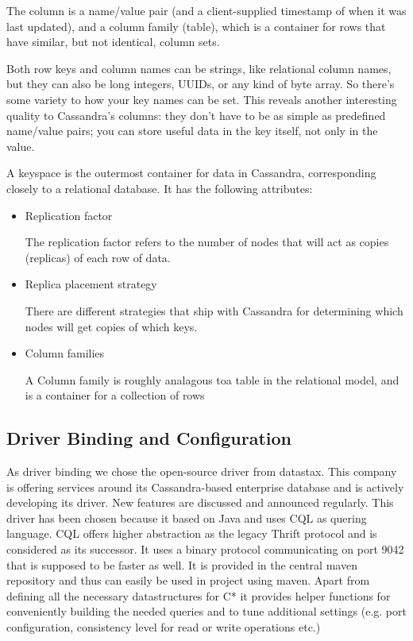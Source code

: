 The column is a name/value pair (and a client-supplied timestamp of when it was last updated), and a column family (table), which is a container for rows that have similar, but not
identical, column sets.

Both row keys and column names can be strings, like relational column names, but they can also be long integers, UUIDs, or any kind of byte array. So there’s some variety to how your key names can be set. This reveals another interesting quality to Cassandra’s columns: they don’t have to be as simple as predefined name/value pairs; you can store useful data in the key itself, not only in the value. 

A keyspace is the outermost container for data in Cassandra, corresponding closely to a relational database. It has the following attributes:
\begin{itemize}
  \item Replication factor
  
  The replication factor refers to the number of nodes that will act as copies (replicas) of each row of data.
  \item Replica placement strategy
  
  There are different strategies that ship with Cassandra for determining which nodes will get copies of which keys.
  \item Column families
  
  A Column family is roughly analagous toa table in the relational model, and is a container for a collection of rows
\end{itemize}

\subsection{Driver Binding and Configuration}
\label{sect:binding}
As driver binding we chose the open-source driver from datastax. This company is offering services around its Cassandra-based enterprise database and is actively developing its driver. New features are discussed and announced regularly. This driver has been chosen because it based on Java and uses CQL as quering language. CQL offers higher abstraction as the legacy Thrift protocol and is considered as its successor. It uses a binary protocol communicating on port 9042 that is supposed to be faster as well. It is provided in the central maven repository and thus can easily be used in project using maven. Apart from defining all the necessary datastructures for C* it provides helper functions for conveniently building the needed queries and to tune additional settings (e.g. port configuration, consistency level for read or write operations etc.)

